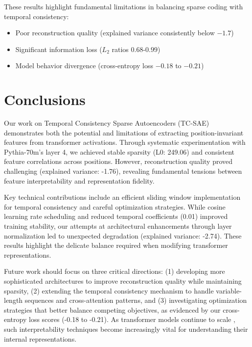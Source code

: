 \documentclass{article} %
\begin{document}
These results highlight fundamental limitations in balancing sparse coding with temporal consistency:
\begin{itemize}
    \item Poor reconstruction quality (explained variance consistently below $-1.7$)
    \item Significant information loss ($L_2$ ratios $0.68$-$0.99$)
    \item Model behavior divergence (cross-entropy loss $-0.18$ to $-0.21$)
\end{itemize}

\section{Conclusions}
\label{sec:conclusion}

Our work on Temporal Consistency Sparse Autoencoders (TC-SAE) demonstrates both the potential and limitations of extracting position-invariant features from transformer activations. Through systematic experimentation with Pythia-70m's layer 4, we achieved stable sparsity (L0: 249.06) and consistent feature correlations across positions. However, reconstruction quality proved challenging (explained variance: -1.76), revealing fundamental tensions between feature interpretability and representation fidelity.

Key technical contributions include an efficient sliding window implementation for temporal consistency and careful optimization strategies. While cosine learning rate scheduling and reduced temporal coefficients (0.01) improved training stability, our attempts at architectural enhancements through layer normalization led to unexpected degradation (explained variance: -2.74). These results highlight the delicate balance required when modifying transformer representations.

Future work should focus on three critical directions: (1) developing more sophisticated architectures to improve reconstruction quality while maintaining sparsity, (2) extending the temporal consistency mechanism to handle variable-length sequences and cross-attention patterns, and (3) investigating optimization strategies that better balance competing objectives, as evidenced by our cross-entropy loss scores (-0.18 to -0.21). As transformer models continue to scale \cite{gpt4}, such interpretability techniques become increasingly vital for understanding their internal representations.



\end{document}
